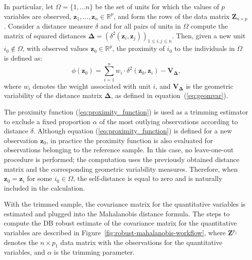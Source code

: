In particular, let $\Omega = \{1, \ldots n\}$ be the set of units for which the values of $p$ variables are observed, $\mathbf{z}_1, \dots, \mathbf{z}_n \in \mathbb{R}^p$, and form the rows of the data matrix $\mathbf{Z}_{n \times p}$. Consider a distance measure $\delta$ and for all pairs of units in $\Omega$ compute the matrix of squared distances $\mathbf{\Delta} =  \left ( \delta^{2} \left(\mathbf{z}_i, \mathbf{z}_j \right) \right)_{1 \leq i,j \leq n}$. Then, given a new unit $i_0\notin \Omega$, with observed values  $\mathbf{z}_0\in \mathbb{R}^p$, the proximity of $i_0$ to the individuals in $\Omega$ is defined as:
\begin{equation} 
\label{eq:proximity_function}
  \phi(\mathbf{z}_0) = \sum_{i = 1}^{n} w_i \cdot \delta^2 (\mathbf{z}_0, \mathbf{z}_i) - \mathbf{V_\Delta},  
\end{equation}
where $w_i$ denotes the weight associated with unit $i$, and $\mathbf{V_\Delta}$ is the geometric variability of the distance matrix $\mathbf{\Delta}$, as defined in equation~(\ref{eq:geomvar}).

The proximity function (\ref{eq:proximity_function}) is used as a trimming estimator to exclude a fixed proportion $\alpha$ of the most outlying observations according to distance $\delta$. Although equation (\ref{eq:proximity_function}) is defined for a new observation $\mathbf{z}_{0}$, in practice the proximity function is also evaluated for observations belonging to the reference sample. In this case, no leave-one-out procedure is performed; the computation uses the previously obtained distance matrix and the corresponding geometric variability measures. Therefore, when $\mathbf{z}_{0}=\mathbf{z}_i$ for some $i_0 \in \Omega$, the self-distance is equal to zero and is naturally included in the calculation.

With the trimmed sample, the covariance matrix for the quantitative variables is estimated and plugged into the Mahalanobis distance formula. 
The steps to compute the DB robust estimate of the covariance matrix for the quantitative variables are described in Figure~\ref{fig:robust-mahalanobis-workflow}, where $\mathbf{Z}^{p_1}$ denotes the $n \times p_1$ data matrix with the observations for the quantitative variables, and $\alpha$ is the trimming parameter.

